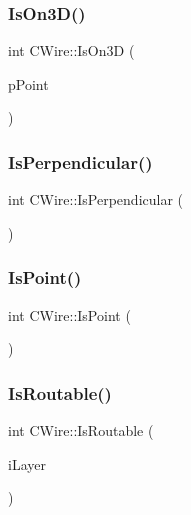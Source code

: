 \mbox{\label{classCWire_a4f6c29e13aad894c7bb57e59ae555421}} 
\subsubsection{\texorpdfstring{IsOn3D()}{IsOn3D()}}
{\footnotesize\ttfamily int C\+Wire\+::\+Is\+On3D (\begin{DoxyParamCaption}\item[{\mbox{\hyperlink{classCPoint}{C\+Point}} $\ast$}]{p\+Point }\end{DoxyParamCaption})}

\mbox{\label{classCWire_aa724c8a82464a69ae346ca284f166754}} 
\subsubsection{\texorpdfstring{IsPerpendicular()}{IsPerpendicular()}}
{\footnotesize\ttfamily int C\+Wire\+::\+Is\+Perpendicular (\begin{DoxyParamCaption}{ }\end{DoxyParamCaption})}

\mbox{\label{classCWire_a47047894df3b85fb3f5af6755002b4f6}} 
\subsubsection{\texorpdfstring{IsPoint()}{IsPoint()}}
{\footnotesize\ttfamily int C\+Wire\+::\+Is\+Point (\begin{DoxyParamCaption}{ }\end{DoxyParamCaption})}

\mbox{\label{classCWire_a3db1c3578cdf422a84a1f796460a9f9e}} 
\subsubsection{\texorpdfstring{IsRoutable()}{IsRoutable()}}
{\footnotesize\ttfamily int C\+Wire\+::\+Is\+Routable (\begin{DoxyParamCaption}\item[{int}]{i\+Layer }\end{DoxyParamCaption})}

